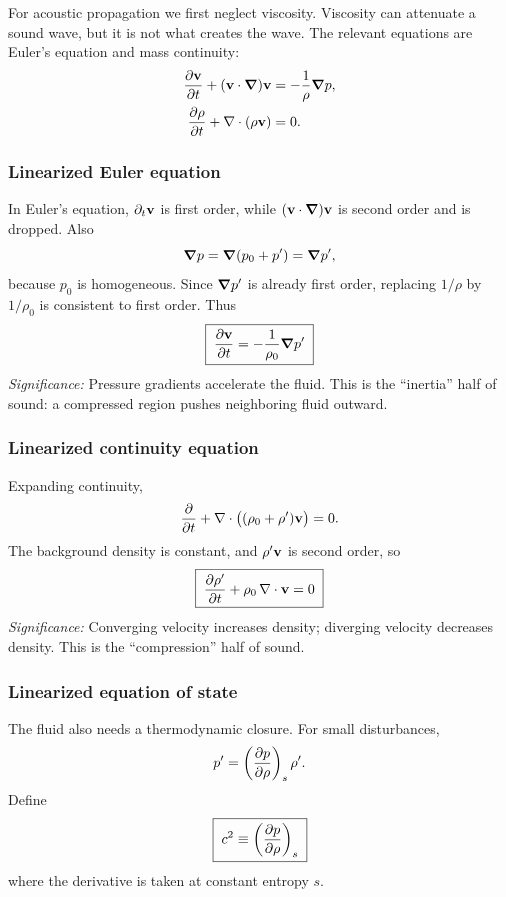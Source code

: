 \documentclass[../main.tex]{subfiles}
\begin{document}
For acoustic propagation we first neglect viscosity. Viscosity can attenuate a
sound wave, but it is not what creates the wave. The relevant equations are
Euler's equation and mass continuity:
\begin{align}
  \pdv{\mathbf{v}}{t}+(\mathbf{v}\cdot\grad)\mathbf{v}&=-\frac{1}{\rho}\grad p,
  \label{eq:lec22_euler_full}\\
  \pdv{\rho}{t}+\nabla \cdot(\rho\mathbf{v})&=0.
  \label{eq:lec22_continuity_full}
\end{align}

\subsubsection*{Linearized Euler equation}
In Euler's equation, $\partial_t\mathbf{v}$ is first order, while
$(\mathbf{v}\cdot\grad)\mathbf{v}$ is second order and is dropped. Also
\[
  \grad p=\grad(p_0+p')=\grad p',
\]
because $p_0$ is homogeneous. Since $\grad p'$ is already first order, replacing
$1/\rho$ by $1/\rho_0$ is consistent to first order. Thus
\begin{equation}
  \boxed{\;\pdv{\mathbf{v}}{t}=-\frac{1}{\rho_0}\grad p'\;}
  \label{eq:lec22_linear_euler}
\end{equation}
\textit{Significance:} Pressure gradients accelerate the fluid. This is the
``inertia'' half of sound: a compressed region pushes neighboring fluid outward.

\subsubsection*{Linearized continuity equation}
Expanding continuity,
\[
  \pdv{}{t}(\rho_0+\rho')+\nabla \cdot\big((\rho_0+\rho')\mathbf{v}\big)=0.
\]
The background density is constant, and $\rho'\mathbf{v}$ is second order, so
\begin{equation}
  \boxed{\;\pdv{\rho'}{t}+\rho_0\,\nabla \cdot\mathbf{v}=0\;}
  \label{eq:lec22_linear_continuity}
\end{equation}
\textit{Significance:} Converging velocity increases density; diverging velocity
decreases density. This is the ``compression'' half of sound.

\subsubsection*{Linearized equation of state}
The fluid also needs a thermodynamic closure. For small disturbances,
\begin{equation}
  p'= \left(\pdv{p}{\rho}\right)_s \rho'.
  \label{eq:lec22_eos_linear}
\end{equation}
Define
\begin{equation}
  \boxed{\;c^2\equiv\left(\pdv{p}{\rho}\right)_s\;}
  \label{eq:lec22_sound_speed_def}
\end{equation}
where the derivative is taken at constant entropy $s$.
\end{document}
